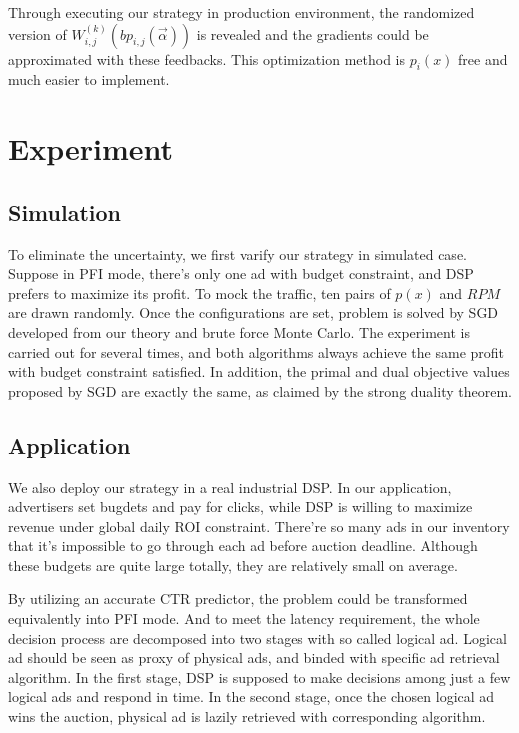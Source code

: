 \documentclass[sigconf]{acmart}
\newcommand{\sbp}{bp_{i,j}}
\newcommand{\sW}{W_{i,j}^{(k)}}
\newcommand{\valpha}{\vec{\alpha}}
\begin{document}
Through executing our strategy in production environment, the randomized version of $\sW(\sbp(\valpha))$ is revealed
    and the gradients could be approximated with these feedbacks.
This optimization method is $p_i(x)$ free and much easier to implement.

\newpage
\section{Experiment}

\subsection{Simulation}

To eliminate the uncertainty, we first varify our strategy in simulated case.
Suppose in PFI mode, there's only one ad with budget constraint, and DSP prefers to maximize its profit.
To mock the traffic, ten pairs of $p(x)$ and $RPM$ are drawn randomly.
Once the configurations are set, problem is solved by SGD developed from our theory and brute force Monte Carlo.
The experiment is carried out for several times, and both algorithms always achieve the same profit with budget constraint satisfied.
In addition, the primal and dual objective values proposed by SGD are exactly the same, as claimed by the strong duality theorem.

\subsection{Application}

We also deploy our strategy in a real industrial DSP.
In our application, advertisers set bugdets and pay for clicks, while DSP is willing to maximize revenue under global daily ROI constraint.
There're so many ads in our inventory that it's impossible to go through each ad before auction deadline.
Although these budgets are quite large totally, they are relatively small on average.

By utilizing an accurate CTR predictor, the problem could be transformed equivalently into PFI mode.
And to meet the latency requirement, the whole decision process are decomposed into two stages with so called logical ad.
Logical ad should be seen as proxy of physical ads, and binded with specific ad retrieval algorithm.
In the first stage, DSP is supposed to make decisions among just a few logical ads and respond in time.
In the second stage, once the chosen logical ad wins the auction, physical ad is lazily retrieved with corresponding algorithm.
\end{document}
